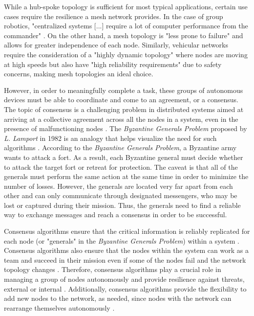 While a hub-spoke topology is sufficient for most typical applications, certain use cases require the resilience a mesh network provides. In the case of group robotics, "centralized systems [...] require a lot of computer performance from the commander" \cite{manet_drone_semenova2015network}. On the other hand, a mesh topology is "less prone to failure" \cite{manet_drone_semenova2015network} and allows for greater independence of each node. Similarly, vehicular networks require the consideration of a "highly dynamic topology" \cite{iov_wu2016internet} where nodes are moving at high speeds but also have "high reliability requirements" \cite{iov_wu2016internet} due to safety concerns, making mesh topologies an ideal choice. 



However, in order to meaningfully complete a task, these groups of autonomous devices must be able to coordinate and come to an agreement, or a consensus. The topic of consensus is a challenging problem in distributed systems aimed at arriving at a collective agreement across all the nodes in a system, even in the presence of malfunctioning nodes \cite{Bach_Mihaljevic_Zagar_2018}. The \textit{Byzantine Generals Problem} proposed by \textit{L. Lamport} in 1982 is an analogy that helps visualize the need for such algorithms \cite{Lamport_1983}. According to the \textit{Byzantine Generals Problem}, a Byzantine army wants to attack a fort. As a result, each Byzantine general must decide whether to attack the target fort or retreat for protection. The caveat is that all of the generals must perform the same action at the same time in order to minimize the number of losses. However, the generals are located very far apart from each other and can only communicate through designated messengers, who may be lost or captured during their mission. Thus, the generals need to find a reliable way to exchange messages and reach a consensus in order to be successful. 

Consensus algorithms ensure that the critical information is reliably replicated for each node (or "generals" in the \textit{Byzantine Generals Problem}) within a system \cite{tsitsiklis1984problems}. Consensus algorithms also ensure that the nodes within the system can work as a team and succeed in their mission even if some of the nodes fail and the network topology changes \cite{raft_paper}. Therefore, consensus algorithms play a crucial role in managing a group of nodes autonomously and provide resilience against threats, external or internal \cite{Kar_Moura_2010}. Additionally, consensus algorithms provide the flexibility to add new nodes to the network, as needed, since nodes with the network can rearrange themselves autonomously \cite{Olfati_Saber_Fax_Murray_2007}. 

